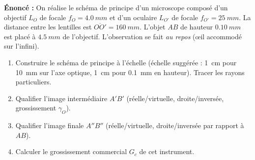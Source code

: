 \documentclass[11pt]{article}
\begin{document}
\begin{exoresolu}
\textbf{Énoncé :} On réalise le schéma de principe d'un microscope composé d'un objectif $L_O$ de focale $f_O = \SI{4,0}{mm}$ et d'un oculaire $L_{O'}$ de focale $f_{O'} = \SI{25}{mm}$. La distance entre les lentilles est $\overline{OO'} = \SI{160}{mm}$. L'objet $AB$ de hauteur $\SI{0,10}{mm}$ est placé à $\SI{4,5}{mm}$ de l'objectif. L'observation se fait \emph{au repos} (œil accommodé sur l'infini).
\begin{enumerate}
    \item Construire le schéma de principe à l'échelle (échelle suggérée : \SI{1}{cm} pour \SI{10}{mm} sur l'axe optique, \SI{1}{cm} pour \SI{0,1}{mm} en hauteur). Tracer les rayons particuliers.
    \item Qualifier l'image intermédiaire $A'B'$ (réelle/virtuelle, droite/inversée, grossissement $\gamma_O$).
    \item Qualifier l'image finale $A''B''$ (réelle/virtuelle, droite/inversée par rapport à $AB$).
    \item Calculer le grossissement commercial $G_c$ de cet instrument.
\end{enumerate}


\end{exoresolu}
\end{document}
